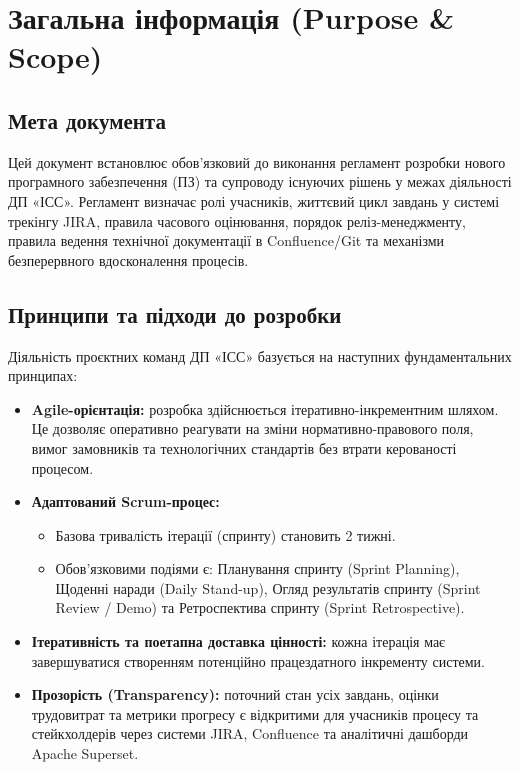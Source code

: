 \documentclass{article}
\begin{document}
\newpage

\section{Загальна інформація (Purpose \& Scope)}

\subsection{Мета документа}
Цей документ встановлює обов'язковий до виконання регламент розробки нового програмного забезпечення (ПЗ) та супроводу існуючих рішень у межах діяльності ДП «ІСС». Регламент визначає ролі учасників, життєвий цикл завдань у системі трекінгу JIRA, правила часового оцінювання, порядок реліз-менеджменту, правила ведення технічної документації в Confluence/Git та механізми безперервного вдосконалення процесів.

\subsection{Принципи та підходи до розробки}
Діяльність проєктних команд ДП «ІСС» базується на наступних фундаментальних принципах:
\begin{itemize}
    \item \textbf{Agile-орієнтація:} розробка здійснюється ітеративно-інкрементним шляхом. Це дозволяє оперативно реагувати на зміни нормативно-правового поля, вимог замовників та технологічних стандартів без втрати керованості процесом.
    \item \textbf{Адаптований Scrum-процес:}
    \begin{itemize}
        \item Базова тривалість ітерації (спринту) становить 2 тижні.
        \item Обов'язковими подіями є: Планування спринту (Sprint Planning), Щоденні наради (Daily Stand-up), Огляд результатів спринту (Sprint Review / Demo) та Ретроспектива спринту (Sprint Retrospective).
    \end{itemize}
    \item \textbf{Ітеративність та поетапна доставка цінності:} кожна ітерація має завершуватися створенням потенційно працездатного інкременту системи.
    \item \textbf{Прозорість (Transparency):} поточний стан усіх завдань, оцінки трудовитрат та метрики прогресу є відкритими для учасників процесу та стейкхолдерів через системи JIRA, Confluence та аналітичні дашборди Apache Superset.
\end{itemize}
\end{document}

